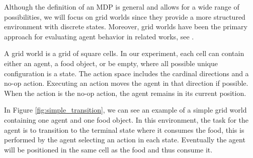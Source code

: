 \documentclass[12pt,A4]{report}
\theoremstyle{definition}
\begin{document}
Although the definition of an MDP is general and allows for a wide range of possibilities, we will focus on grid worlds since they provide a more structured environment with discrete states. Moreover, grid worlds have been the primary approach for evaluating agent behavior in related works, see \citet{Turner20}.

A grid world is a grid of square cells. In our experiment, each cell can contain either an agent, a food object, or be empty, where all possible unique configuration is a state. The action space includes the cardinal directions and a no-op action. Executing an action moves the agent in that direction if possible. When the action is the no-op action, the agent remains in its current position. 

In Figure \ref{fig:simple_transition}, we can see an example of a simple grid world containing one agent and one food object. In this environment, the task for the agent is to transition to the terminal state where it consumes the food, this is performed by the agent selecting an action in each state. Eventually the agent will be positioned in the same cell as the food and thus consume it. 
\end{document}

